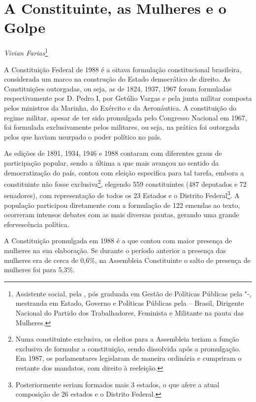 \chapter{A Constituinte, as Mulheres e o Golpe}

\emph{Vivian Farias}\footnote{Assistente social, pela , pós graduada em
  Gestão de Políticas Públicas pela "-, mestranda em Estado,
  Governo e Políticas Públicas pela  -- Brasil, Dirigente Nacional
  do Partido dos Trabalhadores, Feminista e Militante na pauta das
  Mulheres.}

A Constituição Federal de 1988 é a oitava formulação constitucional
brasileira, considerada um marco na construção do Estado democrático de
direito. As Constituições outorgadas, ou seja, as de 1824, 1937, 1967
foram formuladas respectivamente por D. Pedro I, por Getúlio Vargas e
pela junta militar composta pelos ministros da Marinha, do Exército e da
Aeronáutica. A constituição do regime militar, apesar de ter sido
promulgada pelo Congresso Nacional em 1967, foi formulada exclusivamente
pelos militares, ou seja, na prática foi outorgada pelos que haviam
usurpado o poder político no país.

As edições de 1891, 1934, 1946 e 1988 contaram com diferentes graus de
participação popular, sendo a última a que mais avançou no sentido da
democratização do país, contou com eleição especifica para tal tarefa,
embora a constituinte não fosse exclusiva\footnote{Numa constituinte
  exclusiva, os eleitos para a Assembleia teriam a função exclusiva de
  formular a constituição, sendo dissolvida após a promulgação. Em 1987,
  os parlamentares legislaram de maneira ordinária e cumpriram o
  restante dos mandatos, com direito à reeleição.}, elegendo 559
constituintes (487 deputados e 72 senadores), com representação de todos
os 23 Estados e o Distrito Federal\footnote{Posteriormente seriam
  formados mais 3 estados, o que afere a atual composição de 26 estados
  e o Distrito Federal.}. A população participou diretamente com a
formulação de 122 emendas ao texto, ocorreram intensos debates com as
mais diversas pautas, gerando uma grande efervescência política.

A Constituição promulgada em 1988 é a que contou com maior presença de
mulheres na sua elaboração. Se durante o período anterior a presença das
mulheres era de cerca de 0,6\%, na Assembleia Constituinte o salto de
presença de mulheres foi para 5,3\%.

